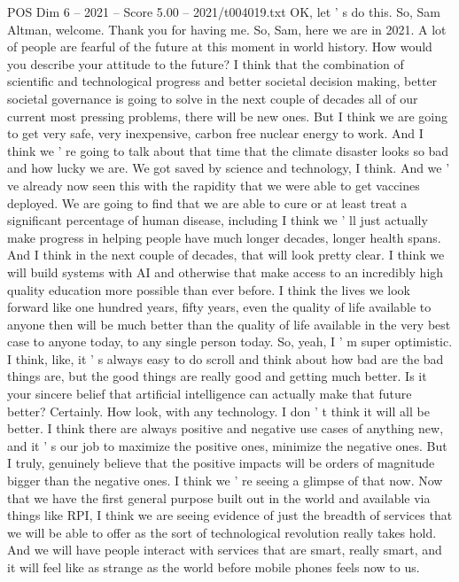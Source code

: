 \begin{textsample}{POS Dim 6 – 2021 – Score 5.00 – 2021/t004019.txt}
OK, let ' s do this.
So, Sam Altman, welcome.
Thank you for having me.
So, Sam, here we are in 2021.
A lot of people are fearful of the future at this moment in world history.
How would you describe your attitude to the future?
I think that the combination of scientific and technological progress and better societal decision making, better societal governance is going to solve in the next couple of decades all of our current most pressing problems, there will be new ones.
But I think we are going to get very safe, very inexpensive, carbon free nuclear energy to work.
And I think we ' re going to talk about that time that the climate disaster looks so bad and how lucky we are.
We got saved by science and technology, I think.
And we ' ve already now seen this with the rapidity that we were able to get vaccines deployed.
We are going to find that we are able to cure or at least treat a significant percentage of human disease, including I think we ' ll just actually make progress in helping people have much longer decades, longer health spans.
And I think in the next couple of decades, that will look pretty clear.
I think we will build systems with AI and otherwise that make access to an incredibly high quality education more possible than ever before.
I think the lives we look forward like one hundred years, fifty years, even the quality of life available to anyone then will be much better than the quality of life available in the very best case to anyone today, to any single person today.
So, yeah, I ' m super optimistic.
I think, like, it ' s always easy to do scroll and think about how bad are the bad things are, but the good things are really good and getting much better.
Is it your sincere belief that artificial intelligence can actually make that future better?
Certainly.
How look, with any technology.
I don ' t think it will all be better.
I think there are always positive and negative use cases of anything new, and it ' s our job to maximize the positive ones, minimize the negative ones.
But I truly, genuinely believe that the positive impacts will be orders of magnitude bigger than the negative ones.
I think we ' re seeing a glimpse of that now.
Now that we have the first general purpose built out in the world and available via things like RPI, I think we are seeing evidence of just the breadth of services that we will be able to offer as the sort of technological revolution really takes hold.
And we will have people interact with services that are smart, really smart, and it will feel like as strange as the world before mobile phones feels now to us.

\end{textsample}
